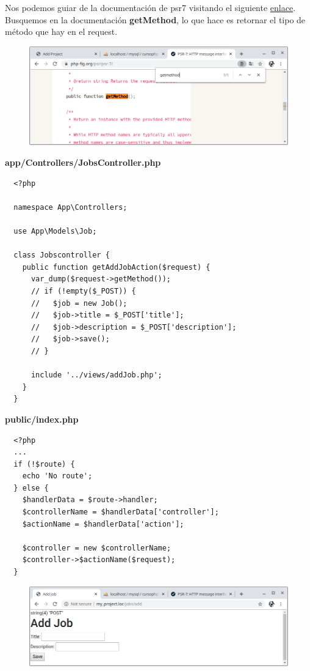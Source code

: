 \documentclass{article}
\begin{document}
Nos podemos guiar de la documentación de psr7 visitando el siguiente
\href{https://www.php-fig.org/psr/psr-7/}{enlace}. Busquemos en la
documentación \textbf{getMethod}, lo que hace es retornar el tipo de método que
hay en el request.\\

\begin{figure}[h!]
  \centering
  \includegraphics[scale=0.5]{./Pictures/141_doc_getmethod.png}
\end{figure}

\textbf{app/Controllers/JobsController.php}
\begin{verbatim}
  <?php

  namespace App\Controllers;

  use App\Models\Job;

  class Jobscontroller {
    public function getAddJobAction($request) {
      var_dump($request->getMethod());
      // if (!empty($_POST)) {
      //   $job = new Job();
      //   $job->title = $_POST['title'];
      //   $job->description = $_POST['description'];
      //   $job->save();
      // }

      include '../views/addJob.php';
    }
  }
\end{verbatim}

\textbf{public/index.php}
\begin{verbatim}
  <?php
  ...
  if (!$route) {
    echo 'No route';
  } else {
    $handlerData = $route->handler;
    $controllerName = $handlerData['controller'];
    $actionName = $handlerData['action'];

    $controller = new $controllerName;
    $controller->$actionName($request);
  }
\end{verbatim}

\begin{figure}[h!]
  \centering
  \includegraphics[scale=0.5]{./Pictures/142_reenviar_formulario.png}
\end{figure}
\end{document}
